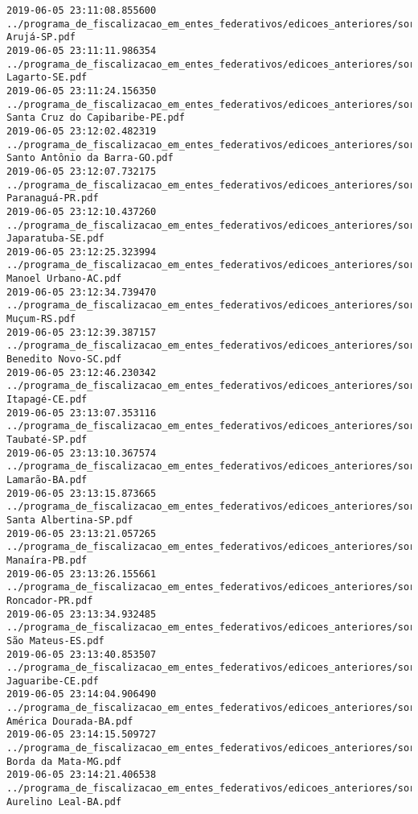 \begin{lstlisting}
2019-06-05 23:11:08.855600 ../programa_de_fiscalizacao_em_entes_federativos/edicoes_anteriores/sorteio_34/1878-Arujá-SP.pdf
2019-06-05 23:11:11.986354 ../programa_de_fiscalizacao_em_entes_federativos/edicoes_anteriores/sorteio_34/1877-Lagarto-SE.pdf
2019-06-05 23:11:24.156350 ../programa_de_fiscalizacao_em_entes_federativos/edicoes_anteriores/sorteio_34/1860-Santa Cruz do Capibaribe-PE.pdf
2019-06-05 23:12:02.482319 ../programa_de_fiscalizacao_em_entes_federativos/edicoes_anteriores/sorteio_34/1840-Santo Antônio da Barra-GO.pdf
2019-06-05 23:12:07.732175 ../programa_de_fiscalizacao_em_entes_federativos/edicoes_anteriores/sorteio_34/1864-Paranaguá-PR.pdf
2019-06-05 23:12:10.437260 ../programa_de_fiscalizacao_em_entes_federativos/edicoes_anteriores/sorteio_34/1876-Japaratuba-SE.pdf
2019-06-05 23:12:25.323994 ../programa_de_fiscalizacao_em_entes_federativos/edicoes_anteriores/sorteio_34/1825-Manoel Urbano-AC.pdf
2019-06-05 23:12:34.739470 ../programa_de_fiscalizacao_em_entes_federativos/edicoes_anteriores/sorteio_34/1872-Muçum-RS.pdf
2019-06-05 23:12:39.387157 ../programa_de_fiscalizacao_em_entes_federativos/edicoes_anteriores/sorteio_34/1875-Benedito Novo-SC.pdf
2019-06-05 23:12:46.230342 ../programa_de_fiscalizacao_em_entes_federativos/edicoes_anteriores/sorteio_34/1835-Itapagé-CE.pdf
2019-06-05 23:13:07.353116 ../programa_de_fiscalizacao_em_entes_federativos/edicoes_anteriores/sorteio_34/1883-Taubaté-SP.pdf
2019-06-05 23:13:10.367574 ../programa_de_fiscalizacao_em_entes_federativos/edicoes_anteriores/sorteio_34/1831-Lamarão-BA.pdf
2019-06-05 23:13:15.873665 ../programa_de_fiscalizacao_em_entes_federativos/edicoes_anteriores/sorteio_34/1882-Santa Albertina-SP.pdf
2019-06-05 23:13:21.057265 ../programa_de_fiscalizacao_em_entes_federativos/edicoes_anteriores/sorteio_34/1857-Manaíra-PB.pdf
2019-06-05 23:13:26.155661 ../programa_de_fiscalizacao_em_entes_federativos/edicoes_anteriores/sorteio_34/1865-Roncador-PR.pdf
2019-06-05 23:13:34.932485 ../programa_de_fiscalizacao_em_entes_federativos/edicoes_anteriores/sorteio_34/1837-São Mateus-ES.pdf
2019-06-05 23:13:40.853507 ../programa_de_fiscalizacao_em_entes_federativos/edicoes_anteriores/sorteio_34/1836-Jaguaribe-CE.pdf
2019-06-05 23:14:04.906490 ../programa_de_fiscalizacao_em_entes_federativos/edicoes_anteriores/sorteio_34/1828-América Dourada-BA.pdf
2019-06-05 23:14:15.509727 ../programa_de_fiscalizacao_em_entes_federativos/edicoes_anteriores/sorteio_34/1843-Borda da Mata-MG.pdf
2019-06-05 23:14:21.406538 ../programa_de_fiscalizacao_em_entes_federativos/edicoes_anteriores/sorteio_34/1829-Aurelino Leal-BA.pdf

\end{lstlisting}
